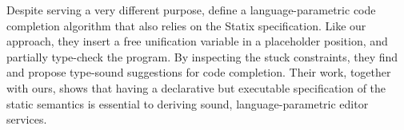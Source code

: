 Despite serving a very different purpose, \citet{PelsmaekerAPV22} define a language-parametric code completion algorithm that also relies on the Statix specification.
Like our approach, they insert a free unification variable in a placeholder position, and partially type-check the program.
By inspecting the stuck constraints, they find and propose type-sound suggestions for code completion.
Their work, together with ours, shows that having a declarative but executable specification of the static semantics is essential to deriving sound, language-parametric editor services.



